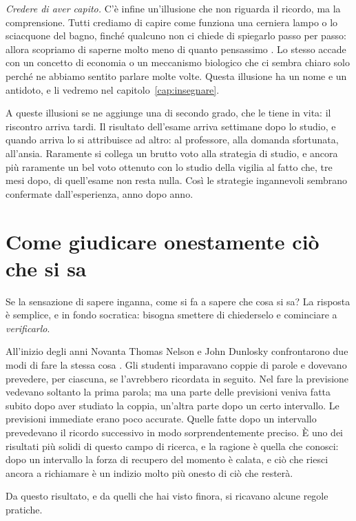\emph{Credere di aver capito.} C'è infine un'illusione che non riguarda
il ricordo, ma la comprensione. Tutti crediamo di capire come funziona
una cerniera lampo o lo sciacquone del bagno, finché qualcuno non ci
chiede di spiegarlo passo per passo: allora scopriamo di saperne molto
meno di quanto pensassimo \parencite{rozenblit2002}. Lo stesso accade
con un concetto di economia o un meccanismo biologico che ci sembra
chiaro solo perché ne abbiamo sentito parlare molte volte. Questa
illusione ha un nome e un antidoto, e li vedremo nel
capitolo~\ref{cap:insegnare}.

A queste illusioni se ne aggiunge una di secondo grado, che le tiene in
vita: il riscontro arriva tardi. Il risultato dell'esame arriva
settimane dopo lo studio, e quando arriva lo si attribuisce ad altro:
al professore, alla domanda sfortunata, all'ansia. Raramente si
collega un brutto voto alla strategia di studio, e ancora più
raramente un bel voto ottenuto con lo studio della vigilia al fatto che,
tre mesi dopo, di quell'esame non resta nulla. Così le strategie
ingannevoli sembrano confermate dall'esperienza, anno dopo anno.

\section{Come giudicare onestamente ciò che si sa}

Se la sensazione di sapere inganna, come si fa a sapere che cosa si sa?
La risposta è semplice, e in fondo socratica: bisogna smettere di
chiederselo e cominciare a \emph{verificarlo}.

All'inizio degli anni Novanta Thomas Nelson e John Dunlosky
confrontarono due modi di fare la stessa cosa \parencite{nelson1991}.
Gli studenti imparavano coppie di parole e dovevano prevedere, per
ciascuna, se l'avrebbero ricordata in seguito. Nel fare la previsione
vedevano soltanto la prima parola; ma una parte delle previsioni veniva
fatta subito dopo aver studiato la coppia, un'altra parte dopo un certo
intervallo. Le previsioni immediate erano poco accurate. Quelle fatte
dopo un intervallo prevedevano il ricordo
successivo in modo sorprendentemente preciso. È uno dei risultati più
solidi di questo campo di ricerca, e la ragione è quella che conosci:
dopo un intervallo la forza di recupero del momento è calata, e ciò che
riesci ancora a richiamare è un indizio molto più onesto di ciò che
resterà.

Da questo risultato, e da quelli che hai visto finora, si ricavano
alcune regole pratiche.


